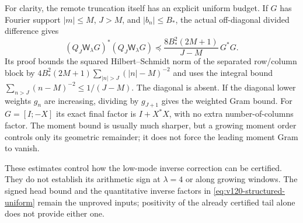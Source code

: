 For clarity, the remote truncation itself has an explicit uniform
budget. If $G$ has Fourier support $|m|\le M$, $J>M$, and
$|b_n|\le B_*$, the actual off-diagonal divided difference gives
\begin{equation}\label{eq:v120-separated-uniform-budget}
 (Q_J\mathsf W_\lambda G)^*(Q_J\mathsf W_\lambda G)
 \preceq\frac{8B_*^2(2M+1)}{J-M}\,G^*G.
\end{equation}
Its proof bounds the squared Hilbert--Schmidt norm of the separated
row/column block by
$4B_*^2(2M+1)\sum_{|n|>J}(|n|-M)^{-2}$ and uses the
integral bound $\sum_{n>J}(n-M)^{-2}\le1/(J-M)$.
The diagonal is absent. If the diagonal lower weights $g_n$ are increasing,
dividing by $g_{J+1}$ gives the weighted Gram bound. For
$G=[I;-X]$ its exact final factor is $I+X^*X$, with no extra
number-of-columns factor. The moment bound is usually much sharper,
but a growing moment order controls only its geometric remainder;
it does not force the leading moment Gram to vanish.

These estimates control how the low-mode inverse correction can be
certified. They do not establish its arithmetic sign at $\lambda=4$
or along growing windows. The signed head bound and the quantitative
inverse factors in \eqref{eq:v120-structured-uniform} remain the
unproved inputs; positivity of the already certified tail alone does
not provide either one.

